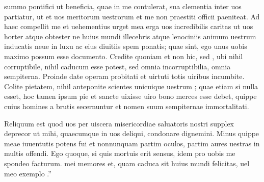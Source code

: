 \documentclass[a5paper,twoside]{article}
\begin{document}
  summo pontifici ut beneficia, quae in me contulerat, sua clementia inter uos partiatur, ut et uos meritorum uestrorum et me non praestiti officii  paeniteat.  Ad haec compellit me et uehementius urget mea erga uos incredibilis caritas ut uos horter atque obtester ne huius mundi illecebris atque lenociniis animum uestrum inducatis neue in luxu ac  eius diuitiis spem  ponatis; quae  sint, ego unus uobis maximo possum esse documento.  Credite quoniam  et non hic, sed , ubi nihil corruptibile, nihil caducum esse potest, sed omnia incorruptibilia, omnia sempiterna.  Proinde date operam probitati et uirtuti totis uiribus incumbite.  Colite pietatem,  nihil anteponite scientes unicuique uestrum ; quae etiam si nulla esset, hoc tamen ipsum pie et sancte uixisse  uiro bono merces esse debet, quippe cuius  homines a brutis secernuntur et nomen suum sempiternae  immortalitati.

Reliquum est quod uos per uiscera misericordiae saluatoris nostri supplex deprecor ut mihi, quaecumque in uos deliqui, condonare dignemini.  Minus quippe meae iuuentutis potens fui et nonnunquam partim oculos, partim aures uestras in multis offendi.    Ego quoque, si quis mortuis erit sensus, idem pro uobis me spondeo facturum.   mei memores et, quam caduca sit huius mundi felicitas, uel meo exemplo .''
\end{document}
